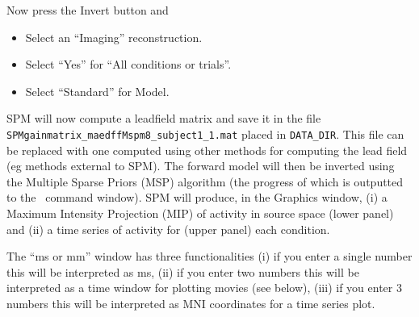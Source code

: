 Now press the Invert button and
\begin{itemize}
\item{Select an ``Imaging'' reconstruction.}
\item{Select ``Yes'' for ``All conditions or trials''.}
\item{Select ``Standard'' for Model.}
\end{itemize}
SPM will now compute a leadfield matrix and save it in the file \texttt{SPMgainmatrix_maedffMspm8_subject1_1.mat} placed in \texttt{DATA\_DIR}. This file can be replaced with one computed using other methods for computing the lead field (eg methods external to SPM). The forward model will then be inverted using the Multiple Sparse Priors (MSP) algorithm (the progress of which is outputted to the \matlab\ command window). SPM will produce, in the Graphics window, (i) a Maximum Intensity Projection (MIP) of activity in source space (lower panel) and (ii) a time series of activity for (upper panel) each condition.

The ``ms or mm'' window has three functionalities (i) if you enter a single number this will be interpreted as ms, (ii) if you enter two numbers this will be interpreted as a time window for plotting movies (see below), (iii) if you enter 3 numbers this will be interpreted as MNI coordinates for a time series plot.

